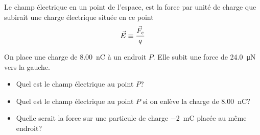 \begin{fondamentalbox}

  Le champ électrique en un point de l'espace, est la force par unité de charge
  que subirait une charge électrique située en ce point
  \[
    \vec{E} \equiv \frac{\vec{F}_e}{q}
  \]
\end{fondamentalbox}


\begin{diapobox}
  On place une charge de \SI{8.00}{nC} à un endroit $P$. Elle subit une force
  de \SI{24.0}{\micro N} vers la gauche.

  \begin{itemize}
    \item Quel est le champ électrique au point $P$?
    \item Quel est le champ électrique au point $P$ si on enlève la charge de
      \SI{8.00}{nC}?
    \item Quelle serait la force sur une particule de charge \SI{-2}{mC} placée
      au même endroit?
  \end{itemize}
\end{diapobox}


